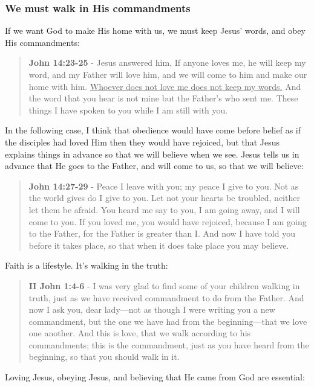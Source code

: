 \documentclass[11pt]{article}
\begin{document}
\subsubsection{We must walk in His commandments}
\label{sec:org46209e1}
If we want God to make His home with us, we must keep Jesus' words, and obey His commandments:

\begin{quote}
\textbf{John 14:23-25} - Jesus answered him, If anyone loves me, he will keep my word, and my Father will love him, and we will come to him and make our home with him. \uline{Whoever does not love me does not keep my words.} And the word that you hear is not mine but the Father's who sent me. These things I have spoken to you while I am still with you.
\end{quote}

In the following case, I think that obedience would have come before belief as if the disciples had loved Him then they would have rejoiced, but that Jesus explains things in advance so that we will believe when we see. Jesus tells us in advance that He goes to the Father, and will come to us, so that we will believe:

\begin{quote}
\textbf{John 14:27-29} - Peace I leave with you; my peace I give to you. Not as the world gives do I give to you. Let not your hearts be troubled, neither let them be afraid. You heard me say to you, I am going away, and I will come to you. If you loved me, you would have rejoiced, because I am going to the Father, for the Father is greater than I. And now I have told you before it takes place, so that when it does take place you may believe.
\end{quote}

Faith is a lifestyle. It's walking in the truth:

\begin{quote}
\textbf{II John 1:4-6} - I was very glad to find some of your children walking in truth, just as we have received commandment to do from the Father. And now I ask you, dear lady—not as though I were writing you a new commandment, but the one we have had from the beginning—that we love one another. And this is love, that we walk according to his commandments; this is the commandment, just as you have heard from the beginning, so that you should walk in it.
\end{quote}

Loving Jesus, obeying Jesus, and believing that He came from God are essential:
\end{document}
